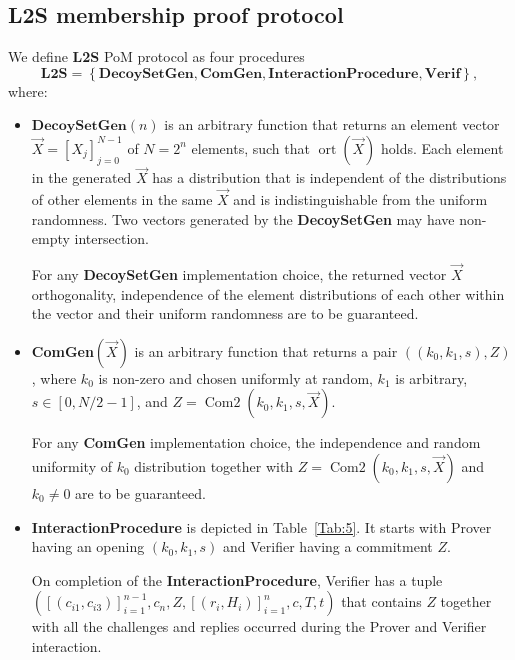 \documentclass{mathcryptology} %
\DeclareMathOperator{\ort}{ort}
\DeclareMathOperator{\ComTwo}{Com2}
\theoremstyle{title}
\theoremstyle{titleof}
\begin{document}
\subsection{L2S membership proof protocol}
    We define \textbf{L2S} PoM protocol as four procedures
    \begin{equation*}
    \textbf{L2S} = \left\{\textbf{DecoySetGen}, \textbf{ComGen}, \textbf{InteractionProcedure}, \textbf{Verif}\right\},
    \end{equation*}
    where:
    \begin{itemize}
        \item $\textbf{DecoySetGen}\left(n\right)$ is an arbitrary function that returns an element vector $\vec{X}= {\left[X_{j}\right]}_{j=0}^{N-1}$ of $N=2^{n}$ elements, such that $\ort\left(\vec{X}\right)$ holds. Each element in the generated $\vec{X}$ has a distribution that is independent of the distributions of other elements in the same $\vec{X}$ and is indistinguishable from the uniform randomness. Two vectors generated by the \textbf{DecoySetGen} may have non-empty intersection.

        For any \textbf{DecoySetGen} implementation choice, the returned vector $\vec{X}$ orthogonality, independence of the element distributions of each other within the vector and their uniform randomness are to be guaranteed.

        \item \textbf{ComGen}$\left(\vec{X}\right)$ is an arbitrary function that returns a pair $\left(\left(k_{0}, k_{1}, s\right), Z\right)$, where $k_{0}$ is non-zero and chosen uniformly at random, $k_{1}$ is arbitrary, $s\in\left[0,N/2-1\right]$, and $Z=\ComTwo\left(k_{0}, k_{1}, s, \vec{X}\right)$. 
        
        For any \textbf{ComGen} implementation choice, the independence and random uniformity of $k_{0}$ distribution together with $Z=\ComTwo\left(k_{0}, k_{1}, s, \vec{X}\right)$ and $k_{0}\neq0$ are to be guaranteed.

        \item \textbf{InteractionProcedure} is depicted in Table~\ref{Tab:5}. It starts with Prover having an opening $\left(k_{0}, k_{1}, s\right)$ and Verifier having a commitment $Z$.

        On completion of the \textbf{InteractionProcedure}, Verifier has a tuple $\left({\left[\left(c_{i1}, c_{i3}\right)\right]}_{i=1}^{n-1},c_{n},Z,{\left[\left(r_{i}, H_{i}\right)\right]}_{i=1}^n,c,T,t\right)$ that contains $Z$ together with all the challenges and replies occurred during the Prover and Verifier interaction.
        \end{itemize}
\end{document}

